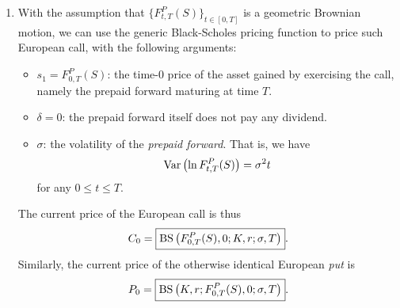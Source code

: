 \begin{enumerate}
\item \label{it:bs-fmla-stock-disc-div}
With the assumption that \(\{F_{t,T}^{P}(S)\}_{t\in[0,T]}\) is a
geometric Brownian motion, we can use the generic Black-Scholes pricing
function to price such European call, with the following arguments:
\begin{itemize}
\item \(s_1=F_{0,T}^{P}(S)\): the time-0 price of the asset gained by
exercising the call, namely the prepaid forward maturing at time \(T\).
\item \(\delta=0\): the prepaid forward itself  does not pay any
dividend.
\item \(\sigma\): the volatility of the \emph{prepaid forward}. That is, we
have
\[
\operatorname{Var}\qty(\ln F_{t,T}^{P}(S))=\sigma^2 t
\]
for any \(0\le t\le T\).
\end{itemize}
The current price of the European call is thus
\[
C_0=\boxed{\operatorname{BS}\qty(F_{0,T}^{P}(S),0;K,r;\sigma,T)}.
\]
Similarly, the current price of the otherwise identical European \emph{put} is
\[
P_0=\boxed{\operatorname{BS}\qty(K,r;F_{0,T}^{P}(S),0;\sigma,T)}.
\]
\end{enumerate}
